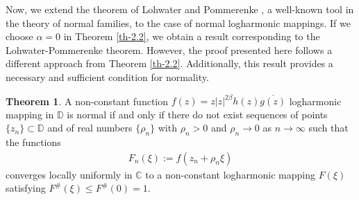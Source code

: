 \documentclass[a4paper,12pt]{amsart}
\theoremstyle{plain}
\theoremstyle{definition}
\newtheorem{thm}{Theorem}[section]
\newcounter {own}
\begin{document}
Now, we extend the theorem of Lohwater and Pommerenke \cite[Theorem 1]{Lohwater-Pommerenke-AASF-1973}, a well-known tool in the theory of normal families, to the case of normal logharmonic mappings. If we choose $\alpha = 0$ in Theorem \ref{th-2.2}, we obtain a result corresponding to the Lohwater-Pommerenke theorem. However, the proof presented here follows a different approach from Theorem \ref{th-2.2}. Additionally, this result provides a necessary and sufficient condition for normality.
\begin{thm}
A non-constant function $f(z)=z|z|^{2\beta}h(z) \overline{g(z)}$ logharmonic mapping in $\mathbb{D}$ is normal if and only if there do not exist sequences of points $\{z_n\}\subset\mathbb{D}$ and of real numbers $\{\rho_n\}$ with $\rho_n>0$ and $\rho_n\rightarrow 0$ as $n\rightarrow\infty$ such that the functions 
\begin{align*}
	F_n(\xi):= f(z_n+\rho_n\xi)
\end{align*}
converges locally uniformly in $\mathbb{C}$ to a non-constant logharmonic mapping $F(\xi)$ satisfying $F^{\#}(\xi)\leq F^{\#}(0)= 1$.
\end{thm}
\end{document}
